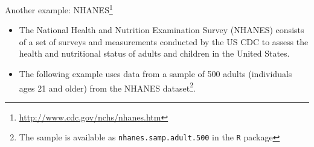 \documentclass[10pt]{beamer}\usepackage[]{graphicx}\usepackage[]{color}
\begin{document}
\begin{frame}{Another example: NHANES\footnote{\tiny{\url{http://www.cdc.gov/nchs/nhanes.htm}}}}
	\begin{itemize}
		\item The National Health and Nutrition Examination Survey (NHANES) consists of a set of surveys and measurements conducted by the US CDC to assess the health and nutritional status of adults	and children in the United States. 
		\item The following example uses data from a sample of 500 adults (individuals ages 21 and older) from the NHANES dataset\footnote{\tiny{The sample is available as \texttt{nhanes.samp.adult.500} in the \texttt{R}  package}}.
	\end{itemize}
\end{frame}
\end{document}
